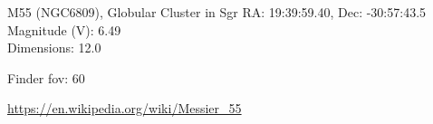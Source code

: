\begin{block}{M55 (NGC6809), Globular Cluster in Sgr}
    RA: 19:39:59.40, Dec: -30:57:43.5 \\ 
    Magnitude (V): 6.49 \\ 
    Dimensions: 12.0 

    Finder fov: 60 

    \url{https://en.wikipedia.org/wiki/Messier_55} 
\end{block}